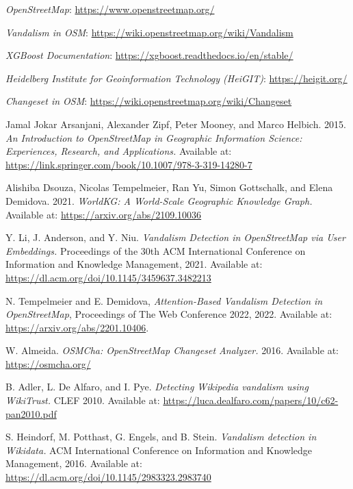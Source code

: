 \documentclass[
    13pt, %
    a4paper, %
    listof=totoc, %
    bibliography=totoc, %
    index=totoc, %
    headsepline
]{scrreprt}
\begin{document}
\begin{thebibliography}{9}

\textit{OpenStreetMap}: \url{https://www.openstreetmap.org/}

\textit{Vandalism in OSM}: \url{https://wiki.openstreetmap.org/wiki/Vandalism}

\textit{XGBoost Documentation}: \url{https://xgboost.readthedocs.io/en/stable/}

\textit{Heidelberg Institute for Geoinformation Technology (HeiGIT)}: \url{https://heigit.org/}

\textit{Changeset in OSM}: \url{https://wiki.openstreetmap.org/wiki/Changeset}

Jamal Jokar Arsanjani, Alexander Zipf, Peter Mooney, and Marco Helbich. 2015.
\textit{An Introduction to OpenStreetMap in Geographic Information Science: Experiences, Research, and Applications.}
Available at: \url{https://link.springer.com/book/10.1007/978-3-319-14280-7}

Alishiba Dsouza, Nicolas Tempelmeier, Ran Yu, Simon Gottschalk, and Elena Demidova. 2021.
\textit{WorldKG: A World-Scale Geographic Knowledge Graph.}
Available at: \url{https://arxiv.org/abs/2109.10036}

Y. Li, J. Anderson, and Y. Niu.
\textit{Vandalism Detection in OpenStreetMap via User Embeddings.}
Proceedings of the 30th ACM International Conference on Information and Knowledge Management, 2021.
Available at: \url{https://dl.acm.org/doi/10.1145/3459637.3482213}

N. Tempelmeier and E. Demidova,
\textit{Attention-Based Vandalism Detection in OpenStreetMap},
Proceedings of The Web Conference 2022, 2022.
Available at: \url{https://arxiv.org/abs/2201.10406}.

W. Almeida.
\textit{OSMCha: OpenStreetMap Changeset Analyzer.}
2016.
Available at: \url{https://osmcha.org/}

B. Adler, L. De Alfaro, and I. Pye.
\textit{Detecting Wikipedia vandalism using WikiTrust.}
CLEF 2010.
Available at: \url{https://luca.dealfaro.com/papers/10/c62-pan2010.pdf}

S. Heindorf, M. Potthast, G. Engels, and B. Stein.
\textit{Vandalism detection in Wikidata.}
ACM International Conference on Information and Knowledge Management, 2016.
Available at: \url{https://dl.acm.org/doi/10.1145/2983323.2983740}


\end{thebibliography}
\end{document}
